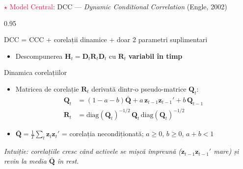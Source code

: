 \documentclass[9pt, aspectratio=169, t]{beamer}
\begin{document}
\begin{frame}{\textcolor{Crimson}{$\star$ Model Central}: DCC --- \textit{Dynamic Conditional Correlation} (Engle, 2002)}
    \begin{cminipage}{0.95\textwidth}
    {\footnotesize
    \begin{block}{DCC = CCC + corelații dinamice + doar 2 parametri suplimentari}
        \begin{itemize}\setlength{\itemsep}{0pt}
            \item Descompunerea $\mathbf{H}_t = \mathbf{D}_t \mathbf{R}_t \mathbf{D}_t$ cu $\mathbf{R}_t$ \textbf{variabil în timp}
        \end{itemize}
    \end{block}
    \begin{block}{Dinamica corelațiilor}
        \begin{itemize}\setlength{\itemsep}{0pt}
            \item Matricea de corelație $\mathbf{R}_t$ derivată dintr-o pseudo-matrice $\mathbf{Q}_t$:
            \begin{align}
                \mathbf{Q}_t &= (1-a-b)\bar{\mathbf{Q}} + a\,\mathbf{z}_{t-1}\mathbf{z}_{t-1}' + b\,\mathbf{Q}_{t-1} \\
                \mathbf{R}_t &= \text{diag}(\mathbf{Q}_t)^{-1/2}\,\mathbf{Q}_t\,\text{diag}(\mathbf{Q}_t)^{-1/2}
            \end{align}
            \item $\bar{\mathbf{Q}} = \frac{1}{T}\sum_t \mathbf{z}_t\mathbf{z}_t'$ = corelația necondiționată; $a \geq 0$, $b \geq 0$, $a + b < 1$
        \end{itemize}
        \textit{Intuiție: corelațiile cresc când activele se mișcă împreună ($\mathbf{z}_{t-1}\mathbf{z}_{t-1}'$ mare) și revin la media $\bar{\mathbf{Q}}$ în rest.}
    \end{block}
    }
    \end{cminipage}
\end{frame}
\end{document}
